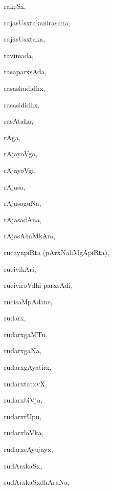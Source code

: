 \begin{multicols}{3}
{\noindent
{rakeSx}, \pageref{rakeSx}

\noindent
{rajasUsxtakanirasana}, \pageref{rajasUsxtakanirasana}

\noindent
{rajasUsxtaka}, \pageref{rajasUsxtaka}

\noindent
{ravimada}, \pageref{ravimada}

\noindent
{rasaparxsAda}, \pageref{rasaparxsAda}

\noindent
{rasashudidhx}, \pageref{rasashudidhx}

\noindent
{rasasididhx}, \pageref{rasasididhx}

\noindent
{rasAtaLa}, \pageref{rasAtaLa}

\noindent
{rAga}, \pageref{rAga}

\noindent
{rAjayoVga}, \pageref{rAjayoVga}

\noindent
{rAjayoVgi}, \pageref{rAjayoVgi}

\noindent
{rAjasa}, \pageref{rAjasa}

\noindent
{rAjasaguNa}, \pageref{rAjasaguNa}

\noindent
{rAjasadAna}, \pageref{rAjasadAna}

\noindent
{rAjasAhaMkAra}, \pageref{rAjasAhaMkAra}

\noindent
{rucayxpiRta (pArxNaliMgApiRta)}, \pageref{rucayxpiRta (pArxNaliMgApiRta)}

\noindent
{rucivikAri}, \pageref{rucivikAri}

\noindent
{ruciviroVdhi parxsAdi}, \pageref{ruciviroVdhiparxsAdi}

\noindent
{rucisaMpAdane}, \pageref{rucisaMpAdane}

\noindent
{rudarx}, \pageref{rudarx}

\noindent
{rudarxgaMTu}, \pageref{rudarxgaMTu}

\noindent
{rudarxgaNa}, \pageref{rudarxgaNa}

\noindent
{rudarxgAyatirx}, \pageref{rudarxgAyatirx}

\noindent
{rudarxtatxvX}, \pageref{rudarxtatxvX}

\noindent
{rudarxbiVja}, \pageref{rudarxbiVja}

\noindent
{rudarxrUpu}, \pageref{rudarxrUpu}

\noindent
{rudarxloVka}, \pageref{rudarxloVka}

\noindent
{rudarxsAyujayx}, \pageref{rudarxsAyujayx}

\noindent
{rudArxkaSx}, \pageref{rudArxkaSx}

\noindent
{rudArxkaSxdhAraNa}, \pageref{rudArxkaSxdhAraNa}

}
\end{multicols}
